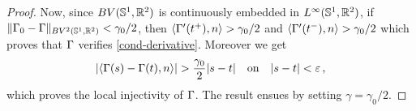 \begin{proof}
Now, since $BV(\mathbb{S}^1,\mathbb{R}^2)$ is continuously embedded in $L^\infty(\mathbb{S}^1,\mathbb{R}^2)$, if
 $\|\Gamma_0 - \Gamma \|_{BV^2(\mathbb{S}^1,\mathbb{R}^2) } < \gamma_0/2$, then $\langle \Gamma'(t^+), n \rangle > \gamma_0/2$ and $\langle \Gamma'(t^-), n \rangle > \gamma_0/2$ which proves that $\Gamma$ verifies \eqref{cond-derivative}. Moreover we get 
$$|\langle \Gamma(s) -\Gamma(t) ,n \rangle| > \frac{\gamma_0}{2}|s-t|\quad \mbox{on} \quad |s - t| < \varepsilon\,,$$ 
which proves the local injectivity of $\Gamma$.
  The result ensues by setting  $\gamma = \gamma_0 / 2$.
\end{proof}

